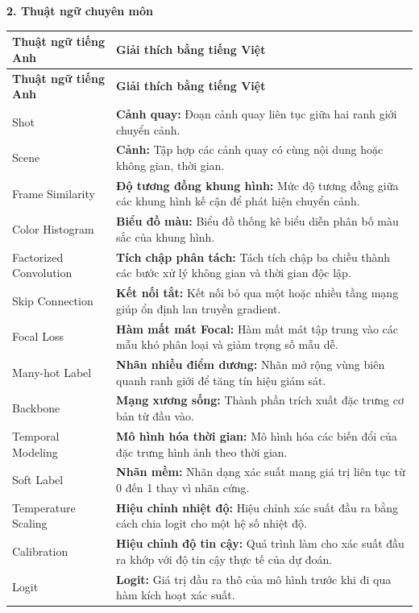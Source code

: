 \noindent\textbf{2. Thuật ngữ chuyên môn}

{
\small
\renewcommand{\arraystretch}{1.2}
\begin{longtable}{L{4.2cm}L{8.8cm}}
\toprule
\textbf{Thuật ngữ tiếng Anh} & \textbf{Giải thích bằng tiếng Việt} \\
\midrule
\endfirsthead
\toprule
\textbf{Thuật ngữ tiếng Anh} & \textbf{Giải thích bằng tiếng Việt} \\
\midrule
\endhead
Shot & \textbf{Cảnh quay:} Đoạn cảnh quay liên tục giữa hai ranh giới chuyển cảnh. \\
Scene & \textbf{Cảnh:} Tập hợp các cảnh quay có cùng nội dung hoặc không gian, thời gian. \\
Frame Similarity & \textbf{Độ tương đồng khung hình:} Mức độ tương đồng giữa các khung hình kế cận để phát hiện chuyển cảnh. \\
Color Histogram & \textbf{Biểu đồ màu:} Biểu đồ thống kê biểu diễn phân bố màu sắc của khung hình. \\
Factorized Convolution & \textbf{Tích chập phân tách:} Tách tích chập ba chiều thành các bước xử lý không gian và thời gian độc lập. \\
Skip Connection & \textbf{Kết nối tắt:} Kết nối bỏ qua một hoặc nhiều tầng mạng giúp ổn định lan truyền gradient. \\
Focal Loss & \textbf{Hàm mất mát Focal:} Hàm mất mát tập trung vào các mẫu khó phân loại và giảm trọng số mẫu dễ. \\
Many-hot Label & \textbf{Nhãn nhiều điểm dương:} Nhãn mở rộng vùng biên quanh ranh giới để tăng tín hiệu giám sát. \\
Backbone & \textbf{Mạng xương sống:} Thành phần trích xuất đặc trưng cơ bản từ đầu vào. \\
Temporal Modeling & \textbf{Mô hình hóa thời gian:} Mô hình hóa các biến đổi của đặc trưng hình ảnh theo thời gian. \\
Soft Label & \textbf{Nhãn mềm:} Nhãn dạng xác suất mang giá trị liên tục từ 0 đến 1 thay vì nhãn cứng. \\
Temperature Scaling & \textbf{Hiệu chỉnh nhiệt độ:} Hiệu chỉnh xác suất đầu ra bằng cách chia logit cho một hệ số nhiệt độ. \\
Calibration & \textbf{Hiệu chỉnh độ tin cậy:} Quá trình làm cho xác suất đầu ra khớp với độ tin cậy thực tế của dự đoán. \\
Logit & \textbf{Logit:} Giá trị đầu ra thô của mô hình trước khi đi qua hàm kích hoạt xác suất. \\

\end{longtable}}
